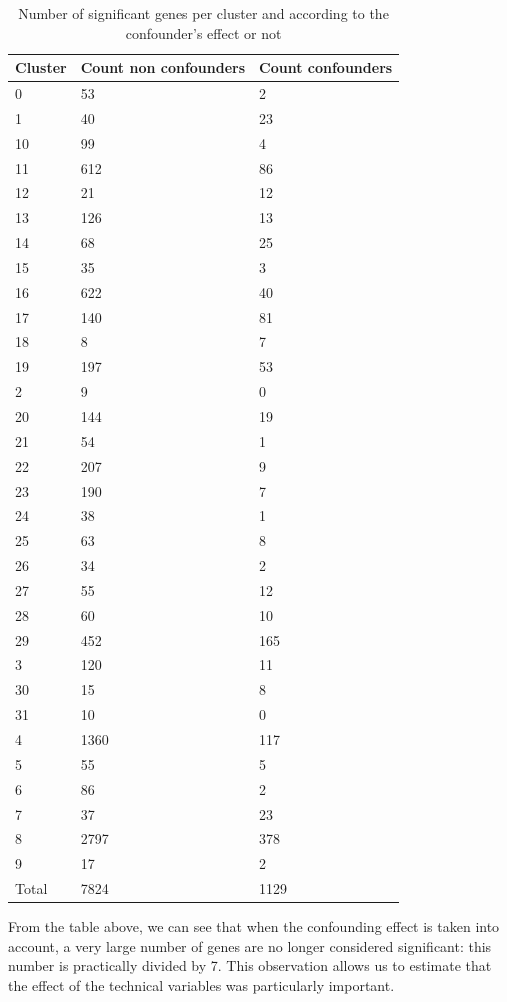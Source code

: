 \documentclass[a4paper, 11pt]{article}
\begin{document}
\begin{multicols}{2}
\begin{table}[H]
	\begin{tabularx}{\textwidth}{|X|X|X|}
	\hline
	Cluster & Count non confounders & Count confounders \\ \hline
	0 & 53 & 2 \\ \hline
	1 & 40 & 23 \\ \hline
	10 & 99 & 4 \\ \hline
	11 & 612 & 86 \\ \hline
	12 & 21 & 12 \\ \hline
	13 & 126 & 13 \\ \hline
	14 & 68 & 25 \\ \hline
	15 & 35 & 3 \\ \hline
	16 & 622 & 40 \\ \hline
	17 & 140 & 81 \\ \hline
	18 & 8 & 7 \\ \hline
	19 & 197 & 53 \\ \hline
	2 & 9 & 0 \\ \hline
	20 & 144 & 19 \\ \hline
	21 & 54 & 1 \\ \hline
	22 & 207 & 9 \\ \hline
	23 & 190 & 7 \\ \hline
	24 & 38 & 1 \\ \hline
	25 & 63 & 8 \\ \hline
	26 & 34 & 2 \\ \hline
	27 & 55 & 12 \\ \hline
	28 & 60 & 10 \\ \hline
	29 & 452 & 165 \\ \hline
	3 & 120 & 11 \\ \hline
	30 & 15 & 8 \\ \hline
	31 & 10 & 0 \\ \hline
	4 & 1360 & 117 \\ \hline
	5 & 55 & 5 \\ \hline
	6 & 86 & 2 \\ \hline
	7 & 37 & 23 \\ \hline
	8 & 2797 & 378 \\ \hline
	9 & 17 & 2 \\ \hline
	Total & 7824 & 1129 \\ \hline
	\end{tabularx}
	\caption{Number of significant genes per cluster and according to the confounder's effect or not}
	\label{tab:sigCount}
	\end{table}
From the table above, we can see that when the confounding effect is taken into account, a very large number of genes are no longer considered significant: this number is practically divided by 7. This observation allows us to estimate that the effect of the technical variables was particularly important.


\end{multicols}
\end{document}
